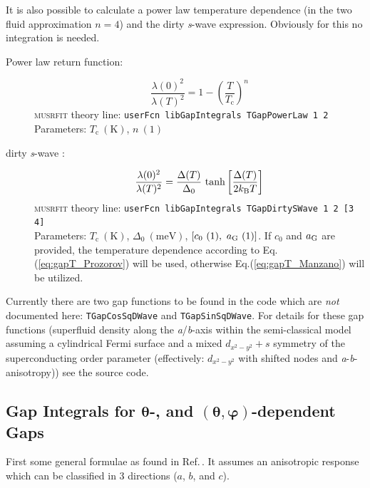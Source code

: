 \documentclass[twoside]{article}
\newcommand{\musrfit}{\textsc{musrfit}\xspace}
\begin{document}
\noindent It is also possible to calculate a power law temperature dependence (in the two fluid approximation $n=4$) and the dirty \textit{s}-wave expression. 
Obviously for this no integration is needed.
\begin{description}
 \item[Power law return function:] 
   \begin{equation}
     \frac{\lambda(0)^2}{\lambda(T)^2} = 1-\left(\frac{T}{T_{\mathrm c}}\right)^n
   \end{equation}
   \musrfit theory line: \verb?userFcn libGapIntegrals TGapPowerLaw 1 2?\\[1.5ex]
   Parameters: $T_{\mathrm c}~(\mathrm{K})$, $n~(1)$
 \item[dirty \textit{s}-wave \cite{Tinkham}:]
    \begin{equation}
      \frac{\lambda(0)^2}{\lambda(T)^2} = \frac{\Delta(T)}{\Delta_0}\,\tanh\left[\frac{\Delta(T)}{2 k_{\rm B} T}\right]
    \end{equation}
    \musrfit theory line: \verb?userFcn libGapIntegrals TGapDirtySWave 1 2 [3 4]?\\[1.5ex]
    Parameters: $T_{\mathrm c}~(\mathrm{K})$, $\Delta_0~(\mathrm{meV})$, $[c_0~(1),~a_{\rm G}~(1)]$. 
    If $c_0$ and $a_{\rm G}$ are provided, the temperature dependence according to Eq.(\ref{eq:gapT_Prozorov}) will be used, 
    otherwise Eq.(\ref{eq:gapT_Manzano}) will be utilized.
\end{description}

\noindent Currently there are two gap functions to be found in the code which are \emph{not} documented here: 
\verb?TGapCosSqDWave? and \verb?TGapSinSqDWave?. For details for these gap functions (superfluid density along the \textit{a}/\textit{b}-axis
within the semi-classical model assuming a cylindrical Fermi surface and a mixed $d_{x^2-y^2} + s$ symmetry of the superconducting order parameter 
(effectively: $d_{x^2-y^2}$ with shifted nodes and \textit{a}-\textit{b}-anisotropy)) see the source code.

\subsection*{Gap Integrals for $\bm{\theta}$-, and $\bm{(\theta, \varphi)}$-dependent Gaps}%

First some general formulae as found in Ref.\,\cite{Prozorov}. It assumes an anisotropic response which can be classified in 3 directions ($a$, $b$, and $c$).
\end{document}

